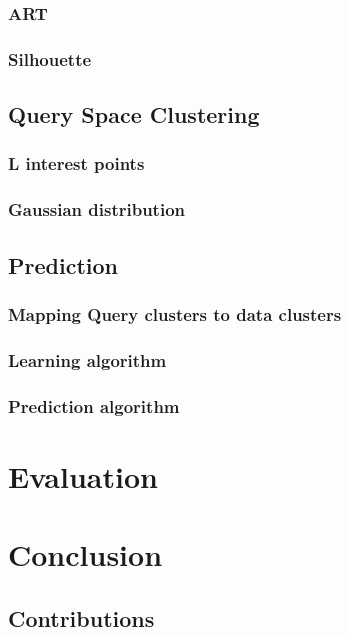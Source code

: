 \documentclass{lmproj}
\begin{document}
\subsection{ART}
\subsection{Silhouette}

\section{Query Space Clustering}
\subsection{L interest points}
\subsection{Gaussian distribution}

\section{Prediction}
\subsection{Mapping Query clusters to data clusters}
\subsection{Learning algorithm}
\subsection{Prediction algorithm}

\chapter{Evaluation}


\chapter{Conclusion}


\section{Contributions}




\end{document}
